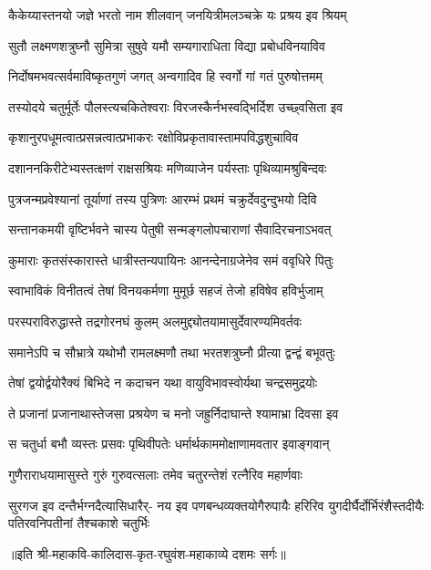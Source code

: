 \twolineshloka
{कैकेय्यास्तनयो जज्ञे भरतो नाम शीलवान्}
{जनयित्रीमलञ्चक्रे यः प्रश्रय इव श्रियम्} %

\twolineshloka
{सुतौ लक्ष्मणशत्रुघ्नौ सुमित्रा सुषुवे यमौ}
{सम्यगाराधिता विद्या प्रबोधविनयाविव} %

\twolineshloka
{निर्दोषमभवत्सर्वमाविष्कृतगुणं जगत्}
{अन्वगादिव हि स्वर्गो गां गतं पुरुषोत्तमम्} %

\twolineshloka
{तस्योदये चतुर्मूर्तेः पौलस्त्यचकितेश्वराः}
{विरजस्कैर्नभस्वद्भिर्दिश उच्छ्वसिता इव} %

\twolineshloka
{कृशानुरपधूमत्वात्प्रसन्नत्वात्प्रभाकरः}
{रक्षोविप्रकृतावास्तामपविद्धशुचाविव} %

\twolineshloka
{दशाननकिरीटेभ्यस्तत्क्षणं राक्षसश्रियः}
{मणिव्याजेन पर्यस्ताः पृथिव्यामश्रुबिन्दवः} %

\twolineshloka
{पुत्रजन्मप्रवेश्यानां तूर्याणां तस्य पुत्रिणः}
{आरम्भं प्रथमं चक्रुर्देवदुन्दुभयो दिवि} %

\twolineshloka
{सन्तानकमयी वृष्टिर्भवने चास्य पेतुषी}
{सन्मङ्गलोपचाराणां सैवादिरचनाऽभवत्} %

\twolineshloka
{कुमाराः कृतसंस्कारास्ते धात्रीस्तन्यपायिनः}
{आनन्देनाग्रजेनेव समं ववृधिरे पितुः} %

\twolineshloka
{स्वाभाविकं विनीतत्वं तेषां विनयकर्मणा}
{मुमूर्छ सहजं तेजो हविषेव हविर्भुजाम्} %

\twolineshloka
{परस्पराविरुद्धास्ते तद्रगोरनघं कुलम्}
{अलमुद्द्योतयामासुर्देवारण्यमिवर्तवः} %

\twolineshloka
{समानेऽपि च सौभ्रात्रे यथोभौ रामलक्ष्मणौ}
{तथा भरतशत्रुघ्नौ प्रीत्या द्वन्द्वं बभूवतुः} %

\twolineshloka
{तेषां द्वयोर्द्वयोरैक्यं बिभिदे न कदाचन}
{यथा वायुविभावस्वोर्यथा चन्द्रसमुद्रयोः} %

\twolineshloka
{ते प्रजानां प्रजानाथास्तेजसा प्रश्रयेण च}
{मनो जह्रुर्निदाघान्ते श्यामाभ्रा दिवसा इव} %

\twolineshloka
{स चतुर्धा बभौ व्यस्तः प्रसवः पृथिवीपतेः}
{धर्मार्थकाममोक्षाणामवतार इवाङ्गवान्} %

\twolineshloka
{गुणैराराधयामासुस्ते गुरुं गुरुवत्सलाः}
{तमेव चतुरन्तेशं रत्नैरिव महार्णवाः} %

\fourlineindentedshloka
{सुरगज इव दन्तैर्भग्नदैत्यासिधारैर्-}
{नय इव पणबन्धव्यक्तयोगैरुपायैः}
{हरिरिव युगदीर्घैर्दोर्भिरंशैस्तदीयैः}
{पतिरवनिपतीनां तैश्चकाशे चतुर्भिः} %

॥इति श्री-महाकवि-कालिदास-कृत-रघुवंश-महाकाव्ये दशमः सर्गः॥

